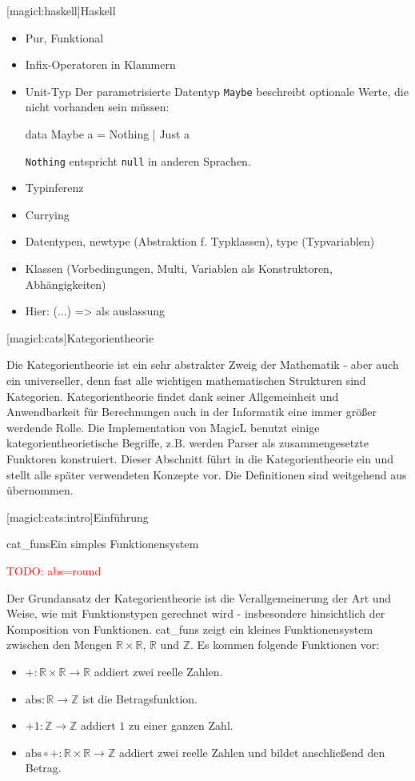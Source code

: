 \documentclass[a4paper, bibgerm]{book}
\newcommand\icode[1]{\lstinline?#1?}
\newcommand{\todo}[1]{
  \textcolor{red}{TODO: #1}
}
\newcommand\lsection{}
\newcommand\lsubsection{}
\newcommand\abb{}
\newcommand\fig{}
\newcommand\ato{\rightarrow} %
\begin{document}
\lsection[magicl:haskell]{Haskell}

\begin{itemize}
\item Pur, Funktional
\item Infix-Operatoren in Klammern
\item Unit-Typ
Der parametrisierte Datentyp \icode{Maybe} beschreibt optionale Werte,
die nicht vorhanden sein müssen:

\begin{code}
data Maybe a = Nothing | Just a
\end{code}

\icode{Nothing} entspricht \icode{null} in anderen Sprachen.
\item Typinferenz
\item Currying
\item Datentypen, newtype (Abstraktion f. Typklassen), type (Typvariablen)
\item Klassen (Vorbedingungen, Multi, Variablen als Konstruktoren, Abhängigkeiten)
\item Hier: (...) => als auslassung
\end{itemize}

\lsection[magicl:cats]{Kategorientheorie}

Die Kategorientheorie ist ein sehr abstrakter Zweig der Mathematik -
aber auch ein universeller, denn fast alle wichtigen mathematischen
Strukturen sind Kategorien. Kategorientheorie findet dank seiner
Allgemeinheit und Anwendbarkeit für Berechnungen auch in der Informatik
eine immer größer werdende Rolle. Die Implementation von MagicL benutzt
einige kategorientheorietische Begriffe, z.B. werden Parser als
zusammengesetzte Funktoren konstruiert. Dieser Abschnitt führt in die
Kategorientheorie ein und stellt alle später verwendeten Konzepte
vor. Die Definitionen sind weitgehend aus \cite{Grundlagen} übernommen.

\lsubsection[magicl:cats:intro]{Einführung}

\fig{cat_funs}{Ein simples Funktionensystem}

\todo{abs=round}

Der Grundansatz der Kategorientheorie ist die Verallgemeinerung der
Art und Weise, wie mit Funktionstypen gerechnet wird - insbesondere
hinsichtlich der Komposition von Funktionen. \abb{cat_funs} zeigt ein
kleines Funktionensystem zwischen den Mengen $\mathbb{R} \times
\mathbb{R}$, $\mathbb{R}$ und $\mathbb{Z}$. Es kommen folgende
Funktionen vor:
\begin{itemize}
\item $+ : \mathbb{R} \times \mathbb{R} \ato \mathbb{R}$ addiert zwei
  reelle Zahlen.
\item $\mathrm{abs} : \mathbb{R} \ato \mathbb{Z}$ ist die Betragsfunktion.
\item $+1 : \mathbb{Z} \ato \mathbb{Z}$ addiert $1$ zu einer ganzen Zahl.
\item $\mathrm{abs} \circ + : \mathbb{R} \times \mathbb{R} \ato \mathbb{Z}$
  addiert zwei reelle Zahlen und bildet anschließend den Betrag.
\end{itemize}
\end{document}
